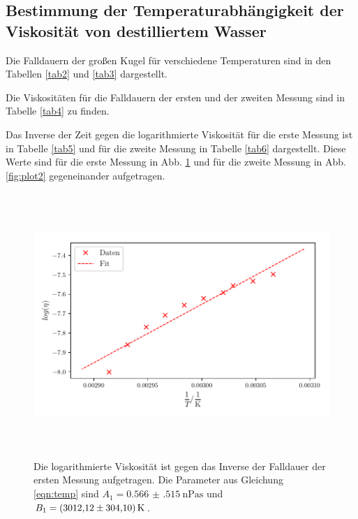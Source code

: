 \subsection{Bestimmung der Temperaturabhängigkeit der Viskosität von destilliertem Wasser}
Die Falldauern der großen Kugel für verschiedene Temperaturen sind in den Tabellen
\ref{tab2} und \ref{tab3} dargestellt.


\noindent Die Viskositäten für die Falldauern der ersten und der zweiten Messung
sind in Tabelle \ref{tab4} zu finden.

\noindent Das Inverse der Zeit gegen die logarithmierte Viskosität für die erste
Messung ist in Tabelle \ref{tab5} und für die zweite Messung in Tabelle
\ref{tab6} dargestellt.
Diese Werte sind für die erste Messung in Abb. \ref{fig:plot1} und für
die zweite Messung in Abb. \ref{fig:plot2} gegeneinander aufgetragen.


\begin{figure}
    \centering
    \includegraphics[width=14cm, height=10cm]{build/plot1.pdf}
    \caption{Die logarithmierte Viskosität ist gegen das Inverse
    der Falldauer der ersten Messung aufgetragen. Die Parameter
    aus Gleichung \eqref{eqn:temp} sind $A_1=\SI{0.566(515)}{\nano\pascal\second}$
    und $B_1=\SI{3012.12 \pm 304.10}{\kelvin}$.}
    \label{fig:plot1}
\end{figure}

